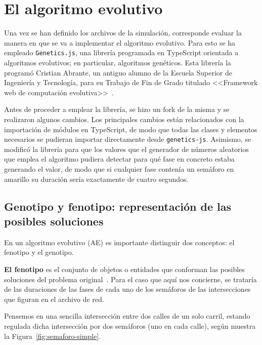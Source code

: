 \section{El algoritmo evolutivo}

Una vez se han definido los archivos de la simulación, corresponde evaluar la manera en que se va a implementar el algoritmo evolutivo. Para esto se ha empleado \texttt{Genetics.js}, una librería programada en TypeScript orientada a algoritmos evolutivos; en particular, algoritmos genéticos. Esta librería la programó Cristian Abrante, un antiguo alumno de la Escuela Superior de Ingeniería y Tecnología, para su Trabajo de Fin de Grado titulado <<Framework web de computación evolutiva>>~\cite{abrante_dorta_framework_2019}. 

Antes de proceder a emplear la librería, se hizo un fork de la misma y se realizaron algunos cambios. Los principales cambios están relacionados con la importación de módulos en TypeScript, de modo que todas las clases y elementos necesarios se pudieran importar directamente desde \texttt{genetics-js}. Asimismo, se modificó la librería para que los valores que el generador de números aleatorios que emplea el algoritmo pudiera detectar para qué fase en concreto estaba generando el valor, de modo que si cualquier fase contenía un semáforo en amarillo su duración sería exactamente de cuatro segundos.

\subsection{Genotipo y fenotipo: representación de las posibles soluciones}

En un algoritmo evolutivo (AE) es importante distinguir dos conceptos: el fenotipo y el genotipo.

\textbf{El fenotipo} es el conjunto de objetos o entidades que conforman las posibles soluciones del problema original~\cite{eiben_introduction_2003}. Para el caso que aquí nos concierne, se trataría de las duraciones de las fases de cada uno de los semáforos de las intersecciones que figuran en el archivo de red.

Pensemos en una sencilla intersección entre dos calles de un solo carril, estando regulada dicha intersección por dos semáforos (uno en cada calle), según muestra la Figura~\ref{fig:semaforo-simple}.

